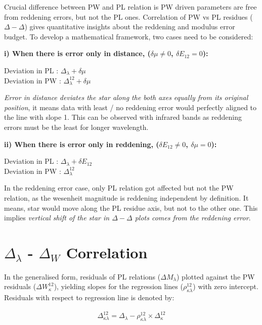 \documentclass[12pt,a4paper]{article}
\begin{document}
Crucial difference between PW and PL relation is PW driven parameters are free from reddening errors, but not the PL ones. Correlation of PW vs PL residues ($\Delta -\Delta$) gives quantitative insights about the reddening and modulus error budget. To develop a mathematical framework, two cases need to be considered:

\textbf{i) When there is error only in distance, ($\delta \mu \neq 0$, $\delta E_{12}= 0$):} 
\begin{center}
Deviation in PL : $\Delta_\lambda + \delta \mu$ \\
Deviation in PW : $\Delta_\lambda^{12} + \delta \mu$
\end{center}

\textit{Error in distance deviates the star along the both axes equally from its original position}, it means data with least / no reddening error would perfectly aligned to the line with slope 1. This can be observed with infrared bands as reddening errors must be the least for longer wavelength.

\textbf{ii) When there is error only in reddening, ($\delta E_{12} \neq 0$, $\delta \mu = 0$): }
\begin{center}
Deviation in PL : $\Delta_\lambda + \delta E_{12}$ \\
Deviation in PW : $\Delta_\lambda^{12}$
\end{center}

In the reddening error case, only PL relation got affected but not the PW relation, as the wesenheit magnitude is reddening independent by definition. It means, star would move along the PL residue axis, but not to the other one. This implies \textit{vertical shift of the star in $\Delta - \Delta$ plots comes from the reddening error}.

\section{$\Delta_\lambda$ - $\Delta_W$ Correlation}

In the generalised form, residuals of PL relations ($\Delta M_\lambda$) plotted against the PW residuals ($\Delta W_\kappa^{12}$), yielding slopes for the regression lines ($\rho_{\kappa \lambda}^{12}$) with zero intercept. Residuals with respect to regression line is denoted by:

\begin{align*}
       \Delta_{\kappa \lambda}^{12} = \Delta_\lambda - \rho_{\kappa \lambda}^{12} \times \Delta_\kappa^{12}
\end{align*}
\end{document}
